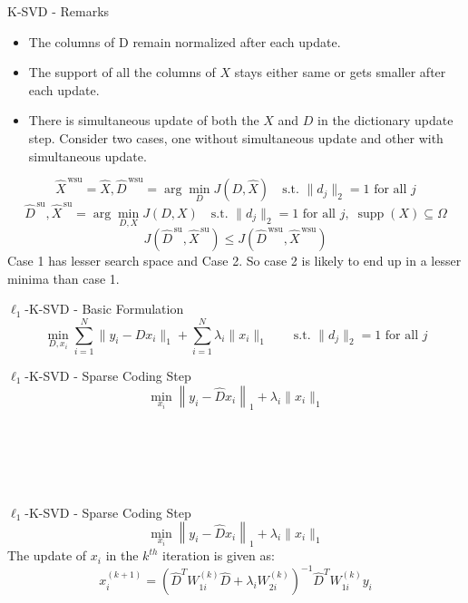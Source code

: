 \documentclass{beamer}
\begin{document}
\begin{frame}{K-SVD - Remarks}
\begin{itemize}
    \item The columns of D remain normalized after each update.
    \item The support of all the columns of $X$ stays either same or gets smaller after each update.
    \item There is simultaneous update of both the $X$ and $D$ in the dictionary update step. Consider two cases, one without simultaneous update and other with simultaneous update.
\end{itemize}
\[
\hat{X}^{\,\mathrm{wsu}} = \hat{X}, 
\hat{D}^{\,\mathrm{wsu}} = \arg\min_{D} J(D,\hat{X})
\quad
\text{s.t. } \|d_j\|_2 = 1 \text{ for all } j
\tag{1}
\]
\[
\hat{D}^{\,\mathrm{su}}, \hat{X}^{\,\mathrm{su}}
=
\arg\min_{D,X} J(D,X)
\quad
\text{s.t. } \|d_j\|_2 = 1 \text{ for all } j,\;
\operatorname{supp}(X) \subseteq \Omega
\tag{2}
\]
\[
J(\hat{D}^{\,\mathrm{su}}, \hat{X}^{\,\mathrm{su}}) \leq J(\hat{D}^{\,\mathrm{wsu}}, \hat{X}^{\,\mathrm{wsu}})
\]
Case 1 has lesser search space and Case 2. So case 2 is likely to end up in a lesser minima than case 1.
\end{frame}

\begin{frame}
\vfill
{}\vfill
\end{frame}

\begin{frame}{$\ell_1$-K-SVD - Basic Formulation}
    \[
    \min_{D,x_i} \sum_{i=1}^{N}\|y_i-Dx_i\|_1
    + \sum_{i=1}^{N}\lambda_i \|x_i\|_1
    \qquad
    \text{s.t. } \|d_j\|_2 = 1 \text{ for all } j
    \]
\end{frame}

\begin{frame}{$\ell_1$-K-SVD - Sparse Coding Step}
    \[
    \min_{x_i} \left\|y_i-\hat{D}x_i\right\|_1 + \lambda_i \|x_i\|_1
    \]
\[
\phantom{x_i^{(k+1)}=
\left(\hat{D}^{T}W_{1i}^{(k)}\hat{D}+\lambda_i W_{2i}^{(k)}\right)^{-1}
\hat{D}^{T}W_{1i}^{(k)}y_i}
\]
\[
\phantom{W_{1i}^{(k+1)}(j)=\frac{1}{\left|(y_i-\hat{D}x_i^{(k)})_j\right|+\epsilon},
\qquad
W_{2i}^{(k+1)}(j)=\frac{1}{\left|(x_i^{(k)})_j\right|+\epsilon}}
\]
\end{frame}

\begin{frame}{$\ell_1$-K-SVD - Sparse Coding Step}
    \[
    \min_{x_i} \left\|y_i-\hat{D}x_i\right\|_1 + \lambda_i \|x_i\|_1
    \]
    The update of $x_i$ in the $k^{th}$ iteration is given as:
    \[
    x_i^{(k+1)}=
    \left(\hat{D}^{T}W_{1i}^{(k)}\hat{D}+\lambda_i W_{2i}^{(k)}\right)^{-1}
    \hat{D}^{T}W_{1i}^{(k)}y_i
    \]
\[
\phantom{W_{1i}^{(k+1)}(j)=\frac{1}{\left|(y_i-\hat{D}x_i^{(k)})_j\right|+\epsilon},
\qquad
W_{2i}^{(k+1)}(j)=\frac{1}{\left|(x_i^{(k)})_j\right|+\epsilon}}
\]
\end{frame}
\end{document}
